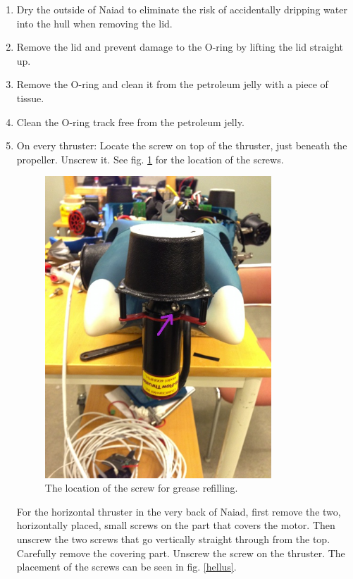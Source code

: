 	\begin{enumerate}
	\item Dry the outside of Naiad to eliminate the risk of accidentally dripping water into the hull when removing the lid.
	\item Remove the lid and prevent damage to the O-ring by lifting the lid straight up.
	\item Remove the O-ring and clean it from the petroleum jelly with a piece of tissue. 
	\item Clean the O-ring track free from the petroleum jelly.
	\item On every thruster: Locate the screw on top of the thruster, just beneath the propeller. Unscrew it. See fig. \ref{happs} for the location of the screws.
	
	\begin{figure}[!ht]
	\begin{center}
		\includegraphics[width=85mm]{./Images/Mechanics/ThrusterScrew.jpg}
		\caption{The location of the screw for grease refilling.}
		\label{happs}
	\end{center}
\end{figure}
	
	For the horizontal thruster in the very back of Naiad, first remove the two, horizontally placed, small screws on the part that covers the motor. Then unscrew the two screws that go vertically straight through from the top. Carefully remove the covering part. Unscrew the screw on the thruster. The placement of the screws can be seen in fig. \ref{hellus}.
	 

\end{enumerate}
